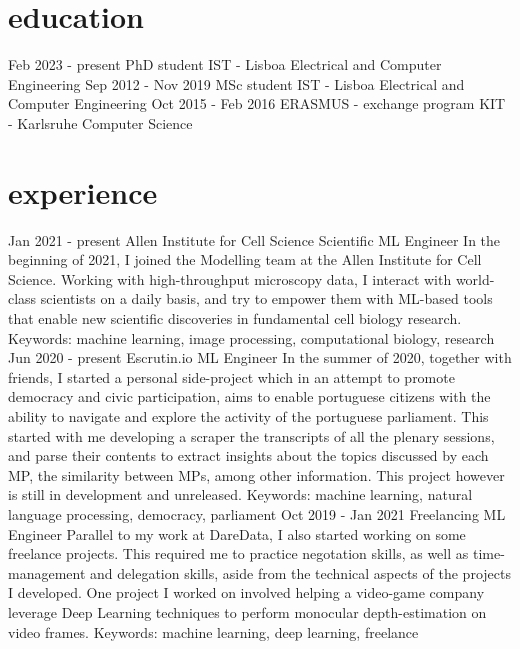 \documentclass[]{colobas-cv}
\begin{document}
\section{education}
\entry
  {Feb 2023 - present}
  {PhD student}
  {IST - Lisboa}
  {Electrical and Computer Engineering}
\entry
  {Sep 2012 - Nov 2019}
  {MSc student}
  {IST - Lisboa}
  {Electrical and Computer Engineering}
\entry
  {Oct 2015 - Feb 2016}
  {ERASMUS - exchange program}
  {KIT - Karlsruhe}
  {Computer Science}

\section{experience}
\entry
  {Jan 2021 - present}
  {Allen Institute for Cell Science}
  {Scientific ML Engineer}
  {In the beginning of 2021, I joined the Modelling team at the Allen Institute
   for Cell Science. Working with high-throughput microscopy data, I interact
   with world-class scientists on a daily basis, and try to empower them with
   ML-based tools that enable new scientific discoveries in fundamental cell
   biology research.
   Keywords: machine learning, image processing, computational biology, research}
\entry
  {Jun 2020 - present}
  {Escrutin.io}
  {ML Engineer}
  {In the summer of 2020, together with friends, I started a personal side-project
   which in an attempt to promote democracy and civic participation, aims to enable
   portuguese citizens with the ability to navigate and explore the activity of the
   portuguese parliament. This started with me developing a scraper
   the transcripts of all the plenary sessions, and parse their contents to extract insights
   about the topics discussed by each MP, the similarity between MPs, among other information.
   This project however is still in development and unreleased.
   Keywords: machine learning, natural language processing, democracy, parliament}
\entry
  {Oct 2019 - Jan 2021}
  {Freelancing}
  {ML Engineer}
  {Parallel to my work at DareData, I also started working on some freelance projects.
   This required me to practice negotation skills, as well as time-management and delegation
   skills, aside from the technical aspects of the projects I developed. One project I worked
   on involved helping a video-game company leverage Deep Learning techniques to perform
   monocular depth-estimation on video frames.
   Keywords: machine learning, deep learning, freelance}
\end{document}
